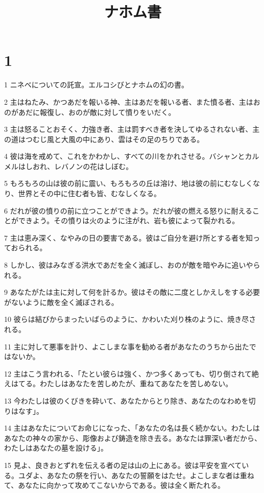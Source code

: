 

\title{ナホム書}


\chapter{1}

\par 1 ニネベについての託宣。エルコシびとナホムの幻の書。
\par 2 主はねたみ、かつあだを報いる神、主はあだを報いる者、また憤る者、主はおのがあだに報復し、おのが敵に対して憤りをいだく。
\par 3 主は怒ることおそく、力強き者、主は罰すべき者を決してゆるされない者、主の道はつむじ風と大風の中にあり、雲はその足のちりである。
\par 4 彼は海を戒めて、これをかわかし、すべての川をかれさせる。バシャンとカルメルはしおれ、レバノンの花はしぼむ。
\par 5 もろもろの山は彼の前に震い、もろもろの丘は溶け、地は彼の前にむなしくなり、世界とその中に住む者も皆、むなしくなる。
\par 6 だれが彼の憤りの前に立つことができよう。だれが彼の燃える怒りに耐えることができよう。その憤りは火のように注がれ、岩も彼によって裂かれる。
\par 7 主は恵み深く、なやみの日の要害である。彼はご自分を避け所とする者を知っておられる。
\par 8 しかし、彼はみなぎる洪水であだを全く滅ぼし、おのが敵を暗やみに追いやられる。
\par 9 あなたがたは主に対して何を計るか。彼はその敵に二度としかえしをする必要がないように敵を全く滅ぼされる。
\par 10 彼らは結びからまったいばらのように、かわいた刈り株のように、焼き尽される。
\par 11 主に対して悪事を計り、よこしまな事を勧める者があなたのうちから出たではないか。
\par 12 主はこう言われる、「たとい彼らは強く、かつ多くあっても、切り倒されて絶えはてる。わたしはあなたを苦しめたが、重ねてあなたを苦しめない。
\par 13 今わたしは彼のくびきを砕いて、あなたからとり除き、あなたのなわめを切りはなす」。
\par 14 主はあなたについてお命じになった、「あなたの名は長く続かない。わたしはあなたの神々の家から、彫像および鋳造を除き去る。あなたは罪深い者だから、わたしはあなたの墓を設ける」。
\par 15 見よ、良きおとずれを伝える者の足は山の上にある。彼は平安を宣べている。ユダよ、あなたの祭を行い、あなたの誓願をはたせ。よこしまな者は重ねて、あなたに向かって攻めてこないからである。彼は全く断たれる。

